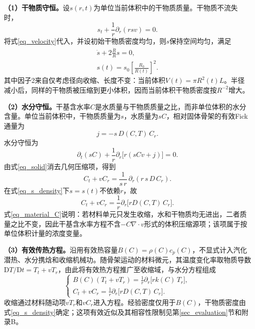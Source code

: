 \medskip
\noindent\textbf{（1）干物质守恒。}设$s(r,t)$为单位当前体积中的干物质质量。干物质不流失时，
\begin{equation}\label{eq_solid}
s_t+\frac{1}{r}\partial_r(r s v)=0.
\end{equation}
将式\eqref{eq_velocity}代入，并设初始干物质密度均匀，则$s$保持空间均匀，满足
\begin{equation}\label{eq_s_density}
\begin{gathered}
\dot s+2\frac{\dot R}{R}s=0,\\
s(t)=s_0\left[\frac{R_0}{R(t)}\right]^{2}.
\end{gathered}
\end{equation}
其中因子2来自仅考虑径向收缩、长度不变：当前体积$V(t)=\pi R^{2}(t)L$。半径减小后，同样的干物质被压缩到更小体积，因而当前体积干物质密度按$R^{-2}$增大。

\medskip
\noindent\textbf{（2）水分守恒。}干基含水率$C$是水质量与干物质质量之比，而非单位体积的水分含量。单位当前体积中，干物质质量为$s$，水质量为$sC$，相对固体骨架的有效Fick通量为
\[
j=-s\,D(C,T)\,C_r.
\]
水分守恒为
\begin{equation}\label{eq_solid_water}
\partial_t(sC)+\frac{1}{r}\partial_r\bigl[r(s C v+j)\bigr]=0.
\end{equation}
由式\eqref{eq_solid}消去几何压缩项，得到
\begin{equation}\label{eq_material_C}
C_t+v C_r=\frac{1}{s\,r}\,\partial_r(r\,s\,D\,C_r).
\end{equation}
在式\eqref{eq_s_density}下$s=s(t)$不依赖$r$，故
\[
C_t+v C_r=\frac{1}{r}\partial_r\bigl[r D(C,T)\,C_r\bigr].
\]
式\eqref{eq_material_C}说明：若材料单元只发生收缩，水和干物质均无进出，二者质量之比不变，因此干基含水率方程不含$-C\nabla\cdot v$形式的体积压缩源项；该项属于按单位体积计量的浓度变量。

\medskip
\noindent\textbf{（3）有效传热方程。}沿用有效热容量$B(C)=\rho(C)c_p(C)$，不显式计入汽化潜热、水分携焓和收缩机械功。随骨架运动的材料微元，其温度变化率取物质导数$\mathrm DT/\mathrm Dt=T_t+vT_r$，由此将有效热方程推广至收缩域，与水分方程组成
\begin{equation}\label{eq_moving}
\left\{
\begin{gathered}
B(C)(T_t+v T_r)=\frac{1}{r}\partial_r\bigl[r k(C)\,T_r\bigr],\\
C_t+v C_r=\frac{1}{r}\partial_r\bigl[r D(C,T)\,C_r\bigr].
\end{gathered}
\right.
\end{equation}
收缩通过材料随动项$vT_r$和$vC_r$进入方程。经验密度仅用于$B(C)$，干物质密度由式\eqref{eq_s_density}确定；这项有效近似及其相容性限制见第\ref{sec_evaluation}节和附录B。

